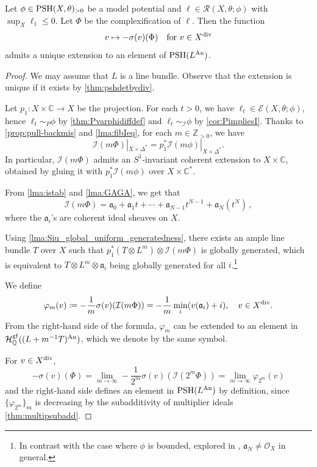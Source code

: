 \begin{proposition}\label{prop:PhiinducePSH}
Let $\phi\in \mathrm{PSH}(X,\theta)_{>0}$ be a model potential and $\ell\in \mathcal{R}(X,\theta;\phi)$ with $\sup_X \ell_1\leq 0$. Let $\Phi$ be the complexification of $\ell$. Then the function
\[
v\mapsto -\sigma(v)(\Phi) \quad \text{for } v\in X^{\operatorname{div}}
\]
admits a unique extension to an element of $\mathrm{PSH}(L^{\mathrm{An}})$.
\end{proposition}
\begin{proof}
We may assume that $L$ is a line bundle. Observe that the extension is unique if it exists by \cref{thm:pshdetbydiv}.

Let $p_1\colon X\times \mathbb{C}\rightarrow X$ be the projection. For each $t>0$, we have $\ell_t\in \mathcal{E}(X,\theta;\phi)$, hence $\ell_t\sim_P\phi$ by \cref{thm:Pvarphidiffdef} and $\ell_t\sim_{\mathcal{I}}\phi$ by \cref{cor:PimpliesI}. Thanks to \cref{prop:pull-backmis} and \cref{lma:fibIeq}, for each $m\in \mathbb{Z}_{>0}$, we have
\[
\mathcal{I}(m\Phi)|_{X\times \Delta^*} = p_1^* \mathcal{I}(m\phi)|_{X\times \Delta^*}.
\]
In particular, $\mathcal{I}(m\Phi)$ admits an $S^1$-invariant coherent extension to $X\times \mathbb{C}$, obtained by gluing it with $p_1^*\mathcal{I}(m\phi)$ over $X\times \mathbb{C}^*$.

From \cref{lma:istab} and \cref{lma:GAGA}, we get that
\begin{equation}\label{eq:ImPhiexp}
\mathcal{I}(m\Phi)=\mathfrak{a}_0 +\mathfrak{a}_1 t+\cdots+\mathfrak{a}_{N-1} t^{N-1}+\mathfrak{a}_N (t^N)\,,
\end{equation}
where the $\mathfrak{a}_i$'s are coherent ideal sheaves on $X$.

Using \cref{lma:Siu_global_uniform_generatedness}, there exists an ample line bundle $T$ over $X$ such that $p_1^* (T\otimes L^m)\otimes \mathcal{I}(m\Phi)$ is globally generated, which is equivalent to $T\otimes L^m\otimes \mathfrak{a}_i$ being globally generated for all $i$.\footnote{In contrast with the case where $\phi$ is bounded, explored in \cite{BBJ21}, $\mathfrak{a}_N \neq \mathcal{O}_X$ in general.}

We define
\[
\varphi_m(v)\coloneqq -\frac{1}{m}\sigma(v)(\mathcal{I}(m\Phi))=-\frac{1}{m}\min_i (v(\mathfrak{a}_i)+i),\quad v\in X^{\operatorname{div}}.
\]
From the right-hand side of the formula, $\varphi_m$ can be extended to an element in $\mathcal{H}^{\mathrm{gf}}_{\mathbb{Q}}((L+m^{-1}T)^{\mathrm{An}})$, which we denote by the same symbol.

For $v\in X^{\operatorname{div}}$,
\[
-\sigma(v)(\Phi)=\lim_{m\to\infty}-\frac{1}{2^m}\sigma(v)(\mathcal{I}(2^m\Phi))=\lim_{m\to\infty}\varphi_{2^m}(v)
\]
and the right-hand side defines an element in $\mathrm{PSH}(L^{\mathrm{An}})$ by definition, since $\{\varphi_{2^m}\}_m$ is decreasing by the subadditivity of multiplier ideals \cref{thm:multipsubadd}.
\end{proof}

